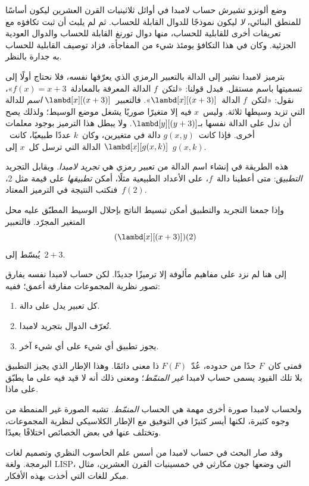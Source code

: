 \documentclass[../../../include/open-logic-section]{subfiles}
\begin{document}

وضع ألونزو تشيرش حساب لامبدا في أوائل ثلاثينيات القرن العشرين
ليكون أساسًا للمنطق البنائي، \emph{لا} ليكون نموذجًا للدوال القابلة
للحساب. ثم لم يلبث أن ثبت تكافؤه مع تعريفات أخرى للقابلية للحساب،
منها دوال تورنغ القابلة للحساب والدوال العودية الجزئية.
وكان في هذا التكافؤ يومئذ شيء من المفاجأة، فزاد توصيف القابلية
للحساب به جدارة بالنظر.

بترميز لامبدا نشير إلى الدالة بالتعبير الرمزي الذي يعرّفها نفسه،
فلا نحتاج أولًا إلى تسميتها باسم مستقل. فبدل قولنا:
«لتكن~$f$ الدالة المعرفة بالمعادلة~$f(x) = x + 3$»، نقول:
«لتكن~$f$ الدالة~$\lambd[x][(x + 3)]$».
فالتعبير~$\lambd[x][(x+3)]$ \emph{اسم} للدالة التي تزيد وسيطها
ثلاثة. وليس~$x$ فيه إلا متغيرًا صوريًا يشغل موضع الوسيط؛
ولذلك يصح أن ندل على الدالة نفسها بـ$\lambd[y][(y + 3)]$.
ولا يبطل هذا الترميز بوجود معلمات أخرى.
فإذا كانت~$g(x, y)$ دالة في متغيرين، وكان~$k$ عددًا طبيعيًا،
كانت~$\lambd[x][g(x,k)]$ الدالة التي ترسل كل~$x$ إلى~$g(x, k)$.

هذه الطريقة في إنشاء اسم الدالة من تعبير رمزي هي
\emph{تجريد لامبدا}. ويقابل التجريد \emph{التطبيق}:
متى أعطينا دالة~$f$، على الأعداد الطبيعية مثلًا، أمكن
\emph{تطبيقها} على قيمة مثل 2، فنكتب النتيجة في الترميز
المعتاد~$f(2)$.

وإذا جمعنا التجريد والتطبيق أمكن تبسيط الناتج بإحلال الوسيط
المطبّق عليه محل المتغير المجرّد. فالتعبير
\[
(\lambd[x][(x + 3)])(2)
\]
يُبسّط إلى~$2 + 3$.

إلى هنا لم نزد على مفاهيم مألوفة إلا ترميزًا جديدًا.
لكن حساب لامبدا نفسه يفارق تصور نظرية المجموعات مفارقة أعمق؛
ففيه:
\begin{enumerate}
\item كل تعبير يدل على دالة.
\item تُعرّف الدوال بتجريد لامبدا.
\item يجوز تطبيق أي شيء على أي شيء آخر.
\end{enumerate}
فمتى كان~$F$ حدًا من حدوده، عُدّ~$F(F)$ ذا معنى دائمًا.
وهذا الإطار الذي يجيز التطبيق بلا تلك القيود يسمى حساب
لامبدا \emph{غير المنمّط}؛ ومعنى ذلك أنه لا قيد فيه على ما
يطبّق على ماذا.

\begin{digress}
ولحساب لامبدا صورة أخرى مهمة هي الحساب \emph{المنمّط}.
تشبه الصورة غير المنمطة من وجوه كثيرة، لكنها أيسر كثيرًا في
التوفيق مع الإطار الكلاسيكي لنظرية المجموعات، وتختلف عنها في
بعض الخصائص اختلافًا بعيدًا.

وقد صار البحث في حساب لامبدا من أسس علم الحاسوب النظري وتصميم
لغات البرمجة. ولغة LISP، التي وضعها جون مكارثي في خمسينيات
القرن العشرين، مثال مبكر للغات التي أخذت بهذه الأفكار.
\end{digress}
\end{document}
